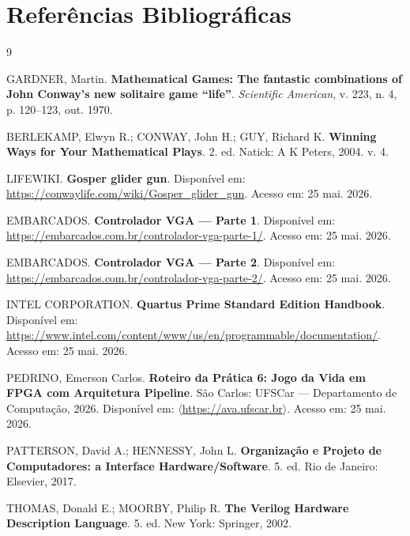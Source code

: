 \documentclass[12pt, a4paper]{article}
\begin{document}
	\section{Referências Bibliográficas}
	
	\begin{thebibliography}{9}
		
		GARDNER, Martin.
		\textbf{Mathematical Games: The fantastic combinations of John Conway's new
			solitaire game ``life''}.
		\textit{Scientific American}, v. 223, n. 4, p. 120--123, out. 1970.
		
		BERLEKAMP, Elwyn R.; CONWAY, John H.; GUY, Richard K.
		\textbf{Winning Ways for Your Mathematical Plays}.
		2. ed. Natick: A K Peters, 2004. v. 4.
		
		LIFEWIKI.
		\textbf{Gosper glider gun}.
		Disponível em: \url{https://conwaylife.com/wiki/Gosper_glider_gun}.
		Acesso em: 25 mai. 2026.
		
		EMBARCADOS.
		\textbf{Controlador VGA --- Parte 1}.
		Disponível em: \url{https://embarcados.com.br/controlador-vga-parte-1/}.
		Acesso em: 25 mai. 2026.
		
		EMBARCADOS.
		\textbf{Controlador VGA --- Parte 2}.
		Disponível em: \url{https://embarcados.com.br/controlador-vga-parte-2/}.
		Acesso em: 25 mai. 2026.
		
		INTEL CORPORATION.
		\textbf{Quartus Prime Standard Edition Handbook}.
		Disponível em: \url{https://www.intel.com/content/www/us/en/programmable/documentation/}.
		Acesso em: 25 mai. 2026.
		
		PEDRINO, Emerson Carlos.
		\textbf{Roteiro da Prática 6: Jogo da Vida em FPGA com Arquitetura Pipeline}.
		São Carlos: UFSCar --- Departamento de Computação, 2026.
		Disponível em: $\langle$\url{https://ava.ufscar.br}$\rangle$. Acesso em: 25 mai. 2026.
		
		PATTERSON, David A.; HENNESSY, John L.
		\textbf{Organização e Projeto de Computadores: a Interface Hardware/Software}.
		5. ed. Rio de Janeiro: Elsevier, 2017.
		
		THOMAS, Donald E.; MOORBY, Philip R.
		\textbf{The Verilog Hardware Description Language}.
		5. ed. New York: Springer, 2002.
		
	\end{thebibliography}
	
	
\end{document}
